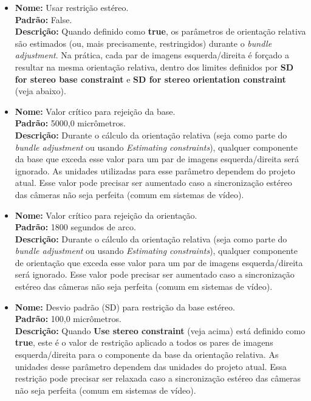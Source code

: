 \documentclass[
  12pt,
  letterpaper,
  DIV=11,
  numbers=noendperiod]{scrreprt}
\begin{document}
\begin{itemize}
\item
  \textbf{Nome:} Usar restrição estéreo.\\
  \textbf{Padrão:} False.\\
  \textbf{Descrição:} Quando definido como \textbf{true}, os parâmetros
  de orientação relativa são estimados (ou, mais precisamente,
  restringidos) durante o \emph{bundle adjustment}. Na prática, cada par
  de imagens esquerda/direita é forçado a resultar na mesma orientação
  relativa, dentro dos limites definidos por \textbf{SD for stereo base
  constraint} e \textbf{SD for stereo orientation constraint} (veja
  abaixo).
\item
  \textbf{Nome:} Valor crítico para rejeição da base.\\
  \textbf{Padrão:} 5000,0 micrômetros.\\
  \textbf{Descrição:} Durante o cálculo da orientação relativa (seja
  como parte do \emph{bundle adjustment} ou usando \emph{Estimating
  constraints}), qualquer componente da base que exceda esse valor para
  um par de imagens esquerda/direita será ignorado. As unidades
  utilizadas para esse parâmetro dependem do projeto atual. Esse valor
  pode precisar ser aumentado caso a sincronização estéreo das câmeras
  não seja perfeita (comum em sistemas de vídeo).
\item
  \textbf{Nome:} Valor crítico para rejeição da orientação.\\
  \textbf{Padrão:} 1800 segundos de arco.\\
  \textbf{Descrição:} Durante o cálculo da orientação relativa (seja
  como parte do \emph{bundle adjustment} ou usando \emph{Estimating
  constraints}), qualquer componente de orientação que exceda esse valor
  para um par de imagens esquerda/direita será ignorado. Esse valor pode
  precisar ser aumentado caso a sincronização estéreo das câmeras não
  seja perfeita (comum em sistemas de vídeo).
\item
  \textbf{Nome:} Desvio padrão (SD) para restrição da base estéreo.\\
  \textbf{Padrão:} 100,0 micrômetros.\\
  \textbf{Descrição:} Quando \textbf{Use stereo constraint} (veja acima)
  está definido como \textbf{true}, este é o valor de restrição aplicado
  a todos os pares de imagens esquerda/direita para o componente da base
  da orientação relativa. As unidades desse parâmetro dependem das
  unidades do projeto atual. Essa restrição pode precisar ser relaxada
  caso a sincronização estéreo das câmeras não seja perfeita (comum em
  sistemas de vídeo).
\end{itemize}
\end{document}
